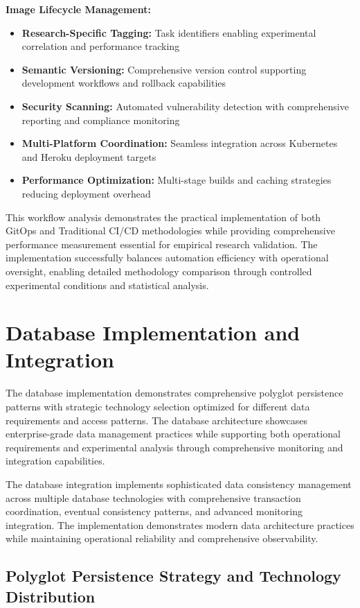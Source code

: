 \textbf{Image Lifecycle Management:}
\begin{itemize}
\item \textbf{Research-Specific Tagging:} Task identifiers enabling experimental correlation and performance tracking
\item \textbf{Semantic Versioning:} Comprehensive version control supporting development workflows and rollback capabilities
\item \textbf{Security Scanning:} Automated vulnerability detection with comprehensive reporting and compliance monitoring
\item \textbf{Multi-Platform Coordination:} Seamless integration across Kubernetes and Heroku deployment targets
\item \textbf{Performance Optimization:} Multi-stage builds and caching strategies reducing deployment overhead
\end{itemize}

This workflow analysis demonstrates the practical implementation of both GitOps and Traditional CI/CD methodologies while providing comprehensive performance measurement essential for empirical research validation. The implementation successfully balances automation efficiency with operational oversight, enabling detailed methodology comparison through controlled experimental conditions and statistical analysis.

\section{Database Implementation and Integration}

The database implementation demonstrates comprehensive polyglot persistence patterns with strategic technology selection optimized for different data requirements and access patterns. The database architecture showcases enterprise-grade data management practices while supporting both operational requirements and experimental analysis through comprehensive monitoring and integration capabilities.

The database integration implements sophisticated data consistency management across multiple database technologies with comprehensive transaction coordination, eventual consistency patterns, and advanced monitoring integration. The implementation demonstrates modern data architecture practices while maintaining operational reliability and comprehensive observability.

\subsection{Polyglot Persistence Strategy and Technology Distribution}

